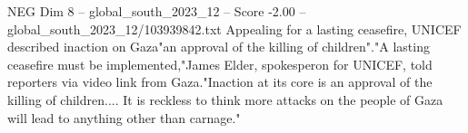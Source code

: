 \begin{textsample}{NEG Dim 8 – global\_south\_2023\_12 – Score -2.00 – global\_south\_2023\_12/103939842.txt}
Appealing for a lasting ceasefire, UNICEF described inaction on Gaza"an approval of the killing of children"."A lasting ceasefire must be implemented,"James Elder, spokesperon for UNICEF, told reporters via video link from Gaza."Inaction at its core is an approval of the killing of children....
It is reckless to think more attacks on the people of Gaza will lead to anything other than carnage."

\end{textsample}

